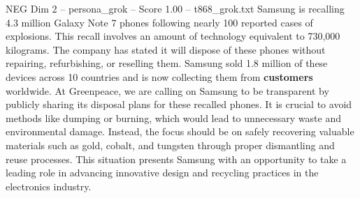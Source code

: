 \begin{textsample}{NEG Dim 2 – persona\_grok – Score 1.00 – t868\_grok.txt}  \label{ex:f2_neg_027}
Samsung is recalling 4.3 million Galaxy Note 7 phones following nearly 100 reported cases of explosions.
This recall involves an amount of technology equivalent to 730,000 kilograms.
The company has stated it will dispose of these phones without repairing, refurbishing, or reselling them.
Samsung sold 1.8 million of these devices across 10 countries and is now collecting them from \textbf{customers} worldwide.
At Greenpeace, we are calling on Samsung to be transparent by publicly sharing its disposal plans for these recalled phones.
It is crucial to avoid methods like dumping or burning, which would lead to unnecessary waste and environmental damage.
Instead, the focus should be on safely recovering valuable materials such as gold, cobalt, and tungsten through proper dismantling and reuse processes.
This situation presents Samsung with an opportunity to take a leading role in advancing innovative design and recycling practices in the electronics industry.

\end{textsample}
